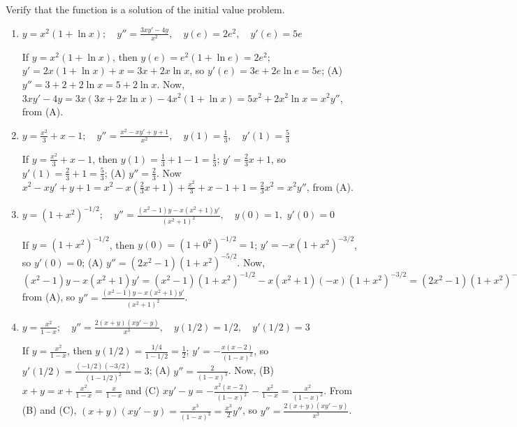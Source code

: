 \documentclass{ximera}
\begin{document}
\begin{problem}\label{exer:1.2.6}
Verify that the  function is a solution of
the initial value problem.

\begin{enumerate}
\item %
$y=x^2(1+\ln x);     \quad y''=\frac{3xy'-4y}{ x^2}, \quad
y(e)=2e^2, \quad y'(e)=5e$



\begin{solution}
    If $y=x^2(1+\ln x)$, then $y(e)=e^2(1+\ln e)=2e^2$;
$y'=2x(1+\ln x)+x=3x+2x\ln x$, so $y'(e)=3e+2e\ln e=5e$; (A)
$y''=3+2+2\ln x=5+2\ln x$. Now, $3xy'-4y=3x(3x+2x\ln x)-4x^2(1+\ln
x)=5x^2+2x^2\ln x=x^2y''$, from (A).
\end{solution}

\item %
$y=\frac{x^2}{3}+x-1;     \quad y''=\frac{x^2-xy'+y+1}{
x^2}, \quad y(1)=\frac{1}{3}, \quad y'(1)=\frac{5}{3}$



\begin{solution}
    If $y=\frac{x^2}{3}+x-1$, then $y(1)=\frac{1}{3}+1-1=\frac{1}{3}$; $y'=\frac{2}{3}x+1$, so $y'(1)=\frac{2}{3}+1=\frac{5}{3}$; (A) $y''=\frac{2}{3}$. Now
$x^2-xy'+y+1=x^2- x\left(\frac{2}{3}x+1\right)+\frac{x^2}{3}+x-1+1=\frac{2}{3}x^2=x^2y''$, from (A).
\end{solution}

\item %
$y=(1+x^2)^{-1/2};     \quad
y''=\frac{(x^2-1)y-x(x^2+1)y'}{ (x^2+1)^2}, \quad y(0)=1,$
$y'(0)=0$



\begin{solution}
    If $y=(1+x^2)^{-1/2}$, then $y(0)=(1+0^2)^{-1/2}=1$;
$y'=-x(1+x^2)^{-3/2}$, so $y'(0)=0$; (A) $y''=(2x^2-1)(1+x^2)^{-5/2}$.
Now,
$(x^2-1)y-x(x^2+1)y'=(x^2-1)(1+x^2)^{-1/2}-x(x^2+1)(-x)(1+x^2)^{-3/2}
=(2x^2-1)(1+x^2)^{-1/2}=y''(1+x^2)^2$ from (A), so
$y''=\frac{(x^2-1)y-x(x^2+1)y'}{(x^2+1)^2}$.
\end{solution}

\item %
$y=\frac{x^2}{ 1-x};    \quad y''=\frac{2(x+y)(xy'-y)}{ x^3},
\quad y(1/2)=1/2, \quad y'(1/2)=3$



\begin{solution}
    If $y=\frac{x^2}{1-x}$, then $y(1/2)=\frac{1/4}{1-1/2}=\frac{1}{2}$; $y'=-\frac{x(x-2)}{(1-x)^2}$, so
$y'(1/2)=\frac{(-1/2)(-3/2)}{(1-1/2)^2}=3$; (A) $y''=\frac{2}{(1-x)^3}$. Now, (B) $x+y=x+\frac{x^2}{1-x}=\frac{x}{1-x}$ and (C)
$xy'-y=-\frac{x^2(x-2)}{(1-x)^2}-\frac{x^2}{1-x}=\frac{x^2}{(1-x)^2}$.
From (B) and (C), $(x+y)(xy'-y)=\frac{x^3}{(1-x)^3}=\frac{x^3}{2}y''$,
so $y''=\frac{2(x+y)(xy'-y)}{x^3}$.
\end{solution}

\end{enumerate}

\end{problem}
\end{document}
